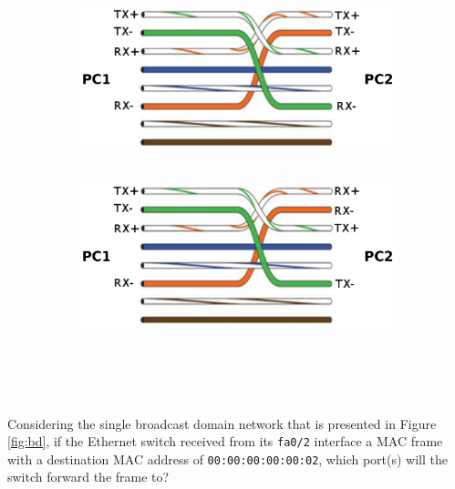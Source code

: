 \documentclass[pdftex,12pt,a4paper]{article}
\begin{document}
\begin{figure}[tbh]
            \begin{subfigure}{.5\textwidth}
              \centering
              \includegraphics[width=.95\textwidth]{figures/fig1c}
              \caption{\ }
              \label{fig:sub3}
            \end{subfigure}%
            \begin{subfigure}{.5\textwidth}
              \centering
              \includegraphics[width=.95\textwidth]{figures/fig1d}
              \caption{\ }
              \label{fig:sub4}
            \end{subfigure}
        \end{figure}

        \newpage

    \section{}
        Considering the single broadcast domain network that is presented in
        Figure \ref{fig:bd}, if the Ethernet switch received from its
        \texttt{fa0/2}
        interface a MAC frame with
        a destination MAC address of \texttt{00:00:00:00:00:02}, which port(s) will
        the switch forward the frame to?
\end{document}
